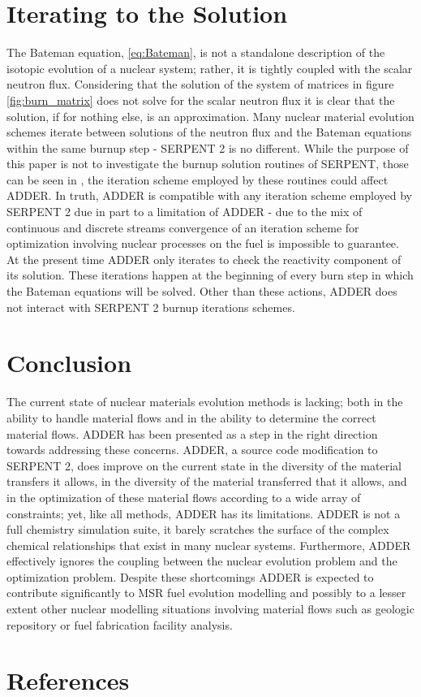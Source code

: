 \documentclass[]{elsarticle}
\begin{document}
\section{Iterating to the Solution} \label{sec:iter}
The Bateman equation, \ref{eq:Bateman}, is not a standalone description of the
isotopic evolution of a nuclear system; rather, it is tightly coupled with the
scalar neutron flux. Considering that the solution of the system of matrices
in figure \ref{fig:burn_matrix} does not solve for the scalar neutron flux
it is clear that the solution, if for nothing else, is an approximation. Many
nuclear material evolution schemes iterate between solutions of the neutron
flux and the Bateman equations within the same burnup step - SERPENT 2 is no 
different. While the purpose of
this paper is not to investigate the burnup solution routines of SERPENT, those
can be seen in \cite{leppanen_burnup_2009}, the iteration scheme employed by
these routines could affect ADDER. In truth, ADDER is compatible with any
iteration scheme employed by SERPENT 2 due in part to a limitation of ADDER -
due to the mix of continuous and discrete streams convergence of an iteration
scheme for optimization involving nuclear processes on the fuel is impossible 
to guarantee. At
the present time ADDER only iterates to check the reactivity component of its
solution. These iterations happen at the beginning of every burn step in which
the Bateman equations will be solved. Other than these actions, ADDER does not
interact with SERPENT 2 burnup iterations schemes.

\section{Conclusion} \label{sec:conc}
The current state of nuclear materials evolution methods is lacking; both in
the ability to handle material flows and in the ability to determine the correct
material flows. ADDER has been presented as a step in the right direction
towards addressing these concerns. ADDER, a source code modification to
SERPENT 2, does improve on the current state
in the diversity of the material transfers it allows, in the diversity of
the material transferred that it allows, and in the optimization of these
material flows according to a wide array of constraints; yet, like all methods,
ADDER has its limitations. ADDER is not a full chemistry simulation suite, it
barely scratches the surface of the complex chemical relationships that exist 
in many nuclear systems. Furthermore, ADDER effectively ignores the coupling 
between the nuclear evolution problem and the optimization problem. Despite
these shortcomings ADDER is expected to contribute significantly to MSR fuel
evolution modelling and possibly to a lesser extent other nuclear modelling
situations involving material flows such as geologic repository or
fuel fabrication facility analysis. 

\section*{References}


\end{document}
